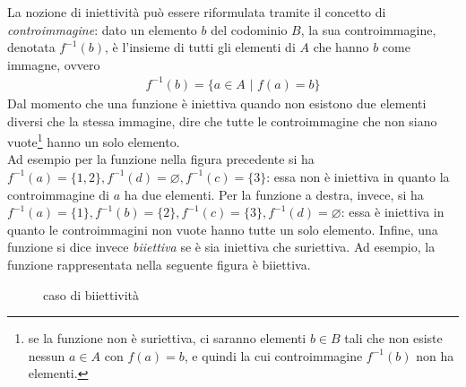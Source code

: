 La nozione di iniettività può essere riformulata tramite il concetto di \textit{controimmagine}: dato
un elemento $b$ del codominio $B$, la sua controimmagine, denotata $f^{-1}(b)$, è l'insieme di tutti gli
elementi di $A$ che hanno $b$ come immagne, ovvero
\begin{eqnarray*}
  f^{-1}(b)=\{a\in A \text{ | } f(a)=b\}
\end{eqnarray*}
Dal momento che una funzione è iniettiva quando non esistono due elementi diversi che la stessa immagine,
dire che tutte le controimmagine che non siano vuote\footnote{se la funzione non è suriettiva, ci
  saranno elementi $b\in B$ tali che non esiste nessun $a\in A$ con $f(a)=b$, e quindi la cui
  controimmagine $f^{-1}(b)$ non ha elementi.} hanno un solo elemento.\\
Ad esempio per la funzione nella figura precedente si ha $f^{-1}(a)=\{1,2\},f^{-1}(d)=\diameter,
f^{-1}(c)=\{3\}$: essa non è iniettiva in quanto la controimmagine di $a$ ha due elementi. Per la
funzione a destra, invece, si ha $f^{-1}(a)=\{1\},f^{-1}(b)=\{2\}, f^{-1}(c)=\{3\},f^{-1}(d)=\diameter$:
essa è iniettiva in quanto le controimmagini non vuote hanno tutte un solo elemento. Infine, una funzione
si dice invece \textit{biiettiva} se è sia iniettiva che suriettiva. Ad esempio, la funzione
rappresentata nella seguente figura è biiettiva.
\clearpage
\begin{figure}[ht!]
  \centering
  \resizebox{10cm}{!}{}
  \caption{caso di biiettività}
  \label{fig:ricgendelfab3}
\end{figure}

